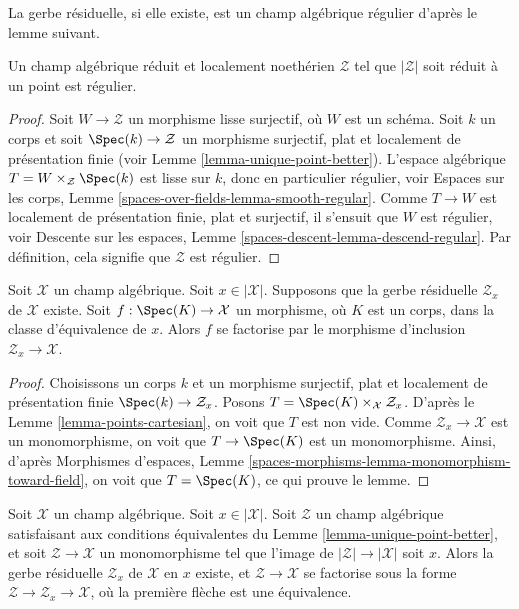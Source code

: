\noindent
La gerbe résiduelle, si elle existe, est un champ algébrique régulier
d'après le lemme suivant.

\begin{lemma}
\label{lemma-residual-gerbe-regular}
Un champ algébrique réduit et localement noethérien $\mathcal{Z}$ tel que
$|\mathcal{Z}|$ soit réduit à un point est régulier.
\end{lemma}

\begin{proof}
Soit $W \to \mathcal{Z}$ un morphisme lisse surjectif, où $W$ est un schéma.
Soit $k$ un corps et soit $\Spec(k) \to \mathcal{Z}$ un morphisme surjectif,
plat et localement de présentation finie (voir
Lemme \ref{lemma-unique-point-better}).
L'espace algébrique $T = W \times_\mathcal{Z} \Spec(k)$ est
lisse sur $k$, donc en particulier régulier, voir
Espaces sur les corps, Lemme \ref{spaces-over-fields-lemma-smooth-regular}.
Comme $T \to W$ est localement de présentation finie, plat et surjectif, il
s'ensuit que $W$ est régulier, voir
Descente sur les espaces, Lemme \ref{spaces-descent-lemma-descend-regular}.
Par définition, cela signifie que $\mathcal{Z}$ est régulier.
\end{proof}

\begin{lemma}
\label{lemma-residual-gerbe-points}
Soit $\mathcal{X}$ un champ algébrique. Soit $x \in |\mathcal{X}|$.
Supposons que la gerbe résiduelle $\mathcal{Z}_x$ de $\mathcal{X}$ existe.
Soit $f : \Spec(K) \to \mathcal{X}$ un morphisme, où $K$ est un corps,
dans la classe d'équivalence de $x$. Alors $f$ se factorise par le morphisme
d'inclusion $\mathcal{Z}_x \to \mathcal{X}$.
\end{lemma}

\begin{proof}
Choisissons un corps $k$ et un morphisme surjectif, plat et localement de présentation finie
$\Spec(k) \to \mathcal{Z}_x$. Posons
$T = \Spec(K) \times_\mathcal{X} \mathcal{Z}_x$. D'après le
Lemme \ref{lemma-points-cartesian},
on voit que $T$ est non vide. Comme $\mathcal{Z}_x \to \mathcal{X}$
est un monomorphisme, on voit que $T \to \Spec(K)$ est un monomorphisme.
Ainsi, d'après
Morphismes d'espaces, Lemme
\ref{spaces-morphisms-lemma-monomorphism-toward-field},
on voit que $T = \Spec(K)$, ce qui prouve le lemme.
\end{proof}

\begin{lemma}
\label{lemma-residual-gerbe-unique}
Soit $\mathcal{X}$ un champ algébrique. Soit $x \in |\mathcal{X}|$.
Soit $\mathcal{Z}$ un champ algébrique satisfaisant aux conditions équivalentes du
Lemme \ref{lemma-unique-point-better},
et soit $\mathcal{Z} \to \mathcal{X}$ un monomorphisme tel que l'image
de $|\mathcal{Z}| \to |\mathcal{X}|$ soit $x$. Alors la gerbe résiduelle
$\mathcal{Z}_x$ de $\mathcal{X}$ en $x$ existe, et
$\mathcal{Z} \to \mathcal{X}$ se factorise sous la forme
$\mathcal{Z} \to \mathcal{Z}_x \to \mathcal{X}$, où la première flèche
est une équivalence.
\end{lemma}

